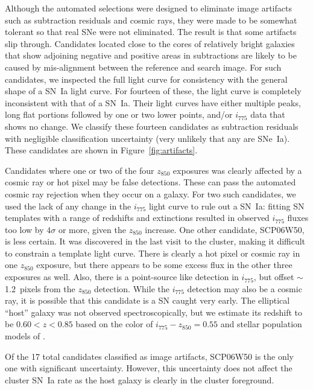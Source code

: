 Although the automated selections were designed to eliminate image
artifacts such as subtraction residuals and cosmic rays, they were
made to be somewhat tolerant so that real SNe were not eliminated. The
result is that some artifacts slip through. Candidates located close
to the cores of relatively bright galaxies that show adjoining
negative and positive areas in subtractions are likely to be caused by
mis-alignment between the reference and search image. For such
candidates, we inspected the full light curve for consistency with the
general shape of a SN~Ia light curve. For fourteen of these, the
light curve is completely inconsistent with that of a SN~Ia. Their
light curves have either multiple peaks, long flat portions followed
by one or two lower points, and/or $i_{775}$ data that shows no
change. We classify these fourteen candidates as subtraction residuals
with negligible classification uncertainty (very unlikely that any are
SNe~Ia). These candidates are shown in Figure~\ref{fig:artifacts}.

Candidates where one or two of the four $z_{850}$ exposures was
clearly affected by a cosmic ray or hot pixel may be false
detections. These can pass the automated cosmic ray rejection when
they occur on a galaxy.  For two such candidates, we used the lack of
any change in the $i_{775}$ light curve to rule out a SN~Ia: fitting
SN templates with a range of redshifts and extinctions resulted in
observed $i_{775}$ fluxes too low by $4\sigma$ or more, given the
$z_{850}$ increase. One other candidate, SCP06W50, is less certain. It
was discovered in the last visit to the cluster, making it difficult
to constrain a template light curve. There is clearly a hot pixel or
cosmic ray in one $z_{850}$ exposure, but there appears to be some
excess flux in the other three exposures as well. Also, there is a
point-source like detection in $i_{775}$, but offset $\sim$1.2~pixels
from the $z_{850}$ detection. While the $i_{775}$ detection may also
be a cosmic ray, it is possible that this candidate is a SN caught
very early. The elliptical ``host'' galaxy was not observed
spectroscopically, but we estimate its redshift to be $0.60 < z < 0.85$
based on the color of $i_{775} - z_{850} = 0.55$ and stellar
population models of \citet[][hereafter BC03]{bruzual03a}.

Of the 17 total candidates classified as image artifacts, SCP06W50 is the
only one with significant uncertainty. However, this uncertainty does
not affect the cluster SN~Ia rate as the host galaxy is clearly in the
cluster foreground.
